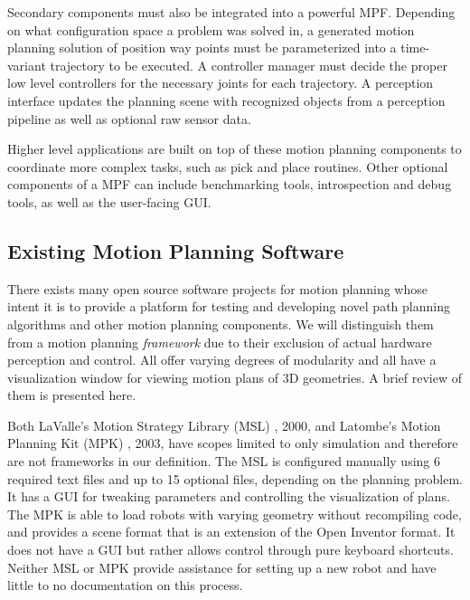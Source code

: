 \documentclass[10pt,journal,compsoc]{joser1}
\begin{document}
{Secondary components must also be integrated into a powerful MPF. Depending on what configuration space a problem was solved in, a generated motion planning solution of position way points must be parameterized into a time-variant trajectory to be executed. A controller manager must decide the proper low level controllers for the necessary joints for each trajectory. A perception interface updates the planning scene with recognized objects from a perception pipeline as well as optional raw sensor data.

Higher level applications are built on top of these motion planning components to coordinate more complex tasks, such as pick and place routines. Other optional components of a MPF can include benchmarking tools, introspection and debug tools, as well as the user-facing GUI.

\subsection{Existing Motion Planning Software}
\label{sec::existing}

There exists many open source software projects for motion planning whose intent it is to provide a platform for testing and developing novel path planning algorithms and other motion planning components. We will distinguish them from a motion planning \textit{framework} due to their exclusion of actual hardware perception and control. All offer varying degrees of modularity and all have a visualization window for viewing motion plans of 3D geometries. A brief review of them is presented here.

Both LaValle's Motion Strategy Library (MSL) \cite{lavallemsl}, 2000, and Latombe's Motion Planning Kit (MPK) \cite{mpk}, 2003, have scopes limited to only simulation and therefore are not frameworks in our definition. The MSL is configured manually using 6 required text files and up to 15 optional files, depending on the planning problem. It has a GUI for tweaking parameters and controlling the visualization of plans. The MPK is able to load robots with varying geometry without recompiling code, and provides a scene format that is an extension of the Open Inventor format. It does not have a GUI but rather allows control through pure keyboard shortcuts. Neither MSL or MPK provide assistance for setting up a new robot and have little to no documentation on this process.

}
\end{document}
